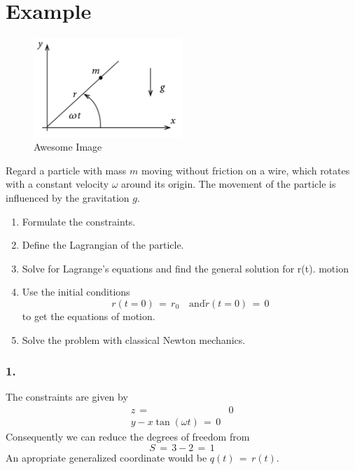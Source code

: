 \section{Example}
\begin{figure}[h]
    \centering
    \includegraphics[width=0.5\textwidth]{images/exercises_1_1.png}
    \caption{Awesome Image}
    \label{fig:awesome_image}
\end{figure}
Regard a particle with mass $m$ moving without friction on a wire, which rotates with a
constant velocity $\omega$ around its origin. The movement of the particle is
influenced by the gravitation $g$.
\begin{enumerate}
  \item Formulate the constraints.
  \item Define the Lagrangian of the particle.
  \item Solve for Lagrange's equations and find the general solution for r(t).
motion 
  \item Use the initial conditions
    \begin{equation*}
      r(t=0) \,=\, r_0 \quad \text{and} \dot r(t=0) \,=\, 0
    \end{equation*}
    to get the equations of motion.
  \item Solve the problem with classical Newton mechanics.
\end{enumerate}
\subsubsection{1.} 
The constraints are given by
\begin{align*}
  z \,=\,& 0 \\
  y - x \tan(\omega t) \,=\, 0
\end{align*}
Consequently we can reduce the degrees of freedom from 
\begin{equation*}
  S \,=\, 3 - 2 \,=\, 1
\end{equation*}
An apropriate generalized coordinate would be $q(t) \,=\, r(t)$.
